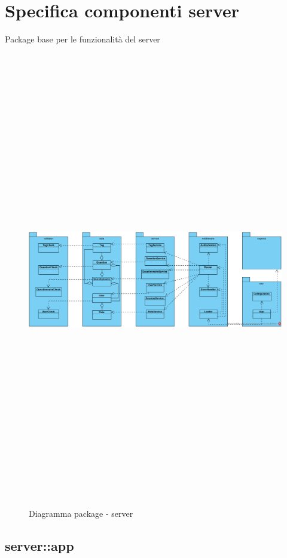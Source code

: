 \section{Specifica componenti server}
Package base per le funzionalità del server\begin{center}
	\begin{figure}[H]
		\centering \includegraphics[angle=90, height=20cm]{../img/diagrammiClassi/server.png}
		\caption{Diagramma package - server}
	\end{figure}
\end{center}\subsection{server::app}
